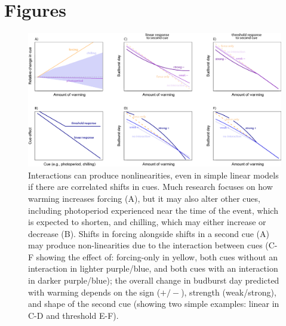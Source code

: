 \documentclass[11pt,letter]{article}
\begin{document}
\section{Figures}
\clearpage
\begin{figure}
\centering
\includegraphics[width=1\textwidth]{..//..//analyses/limitingcues/figures/intxnsims2021photoaltwithchill_6panels_polyg_imc.png}
\caption{Interactions can produce nonlinearities, even in simple linear models if there are correlated shifts in cues. Much research focuses on how warming increases forcing (A), but it may also alter other cues, including photoperiod experienced near the time of the event, which is expected to shorten, and chilling, which may either increase or decrease (B). Shifts in forcing alongside shifts in a second cue (A) may produce non-linearities due to the interaction between cues (C-F showing the effect of: forcing-only in yellow, both cues without an interaction in lighter purple/blue, and both cues with an interaction in darker purple/blue); the overall change in budburst day predicted with warming depends on the sign ($+/-$), strength (weak/strong), and shape of the second cue (showing two simple examples: linear in C-D and threshold E-F).}
  \label{fig:intxncues}
\end{figure}
\end{document}
